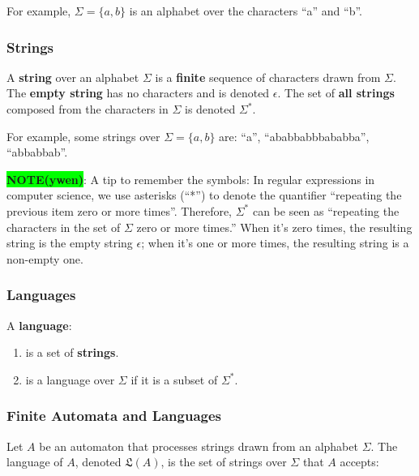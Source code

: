\documentclass[12pt, letterpaper, oneside]{book}
\begin{document}
For example, $\Sigma = \{a, b\}$ is an alphabet over the characters ``a'' and ``b''.

\subsubsection{Strings}

A \textbf{string} over an alphabet $\Sigma$ is a \textbf{finite} sequence of characters drawn from $\Sigma$. The
\textbf{empty string} has no characters and is denoted $\epsilon$. The set of \textbf{all strings} composed from the
characters in $\Sigma$ is denoted $\Sigma^*$.

For example, some strings over $\Sigma = \{a, b\}$ are: ``a'', ``ababbabbbababba'', ``abbabbab''.

\colorbox{lime}{\textbf{NOTE(ywen)}}: A tip to remember the symbols: In regular expressions in computer science, we use
asterisks (``*'') to denote the quantifier ``repeating the previous item zero or more times''. Therefore, $\Sigma^*$
can be seen as ``repeating the characters in the set of $\Sigma$ zero or more times.'' When it's zero times, the
resulting string is the empty string $\epsilon$; when it's one or more times, the resulting string is a non-empty one.

\subsubsection{Languages}

A \textbf{language}:
\begin{enumerate}
  \item is a set of \textbf{strings}.
  \item is a language over $\Sigma$ if it is a subset of $\Sigma^*$.
\end{enumerate}

\subsubsection{Finite Automata and Languages} \label{automata:automata-and-languages}

Let $A$ be an automaton that processes strings drawn from an alphabet $\Sigma$. The language of $A$, denoted
$\mathfrak{L}(A)$, is the set of strings over $\Sigma$ that $A$ accepts:
\end{document}
